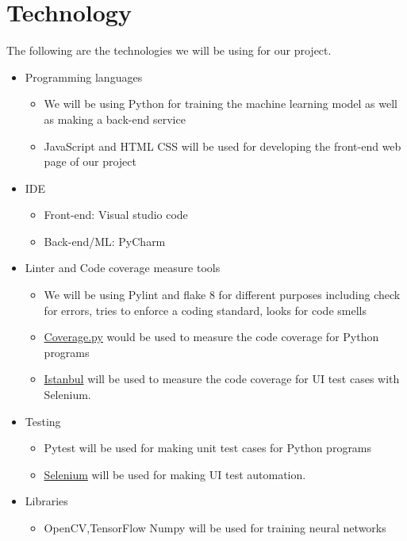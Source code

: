 \documentclass[12pt,letterpaper]{article}
\begin{document}
\section{Technology}
The following are the technologies we will be using for our project.
\begin{itemize}
    \item Programming languages
    \begin{itemize}
        \item We will be using Python for training the machine learning model as
        well as making a back-end service 
        \item JavaScript and HTML CSS will be used for developing the front-end
        web page of our project
    \end{itemize}
    \item IDE
    \begin{itemize}
        \item Front-end: Visual studio code
        \item Back-end/ML: PyCharm
    \end{itemize}
    \item Linter and Code coverage measure tools
    \begin{itemize}
        \item We will be using Pylint and flake 8 for different purposes
        including check for errors, tries to enforce a coding standard, looks
        for code smells
        \item \href{https://coverage.readthedocs.io/en/6.5.0/}{Coverage.py}
        would be used to measure the code coverage for Python programs
        \item \href{https://istanbul.js.org/}{Istanbul} will be used to measure
        the code coverage for UI test cases with Selenium.
    \end{itemize}
    \item Testing
    \begin{itemize}
        \item Pytest will be used for making unit test cases for Python programs
        \item \href{https://www.selenium.dev/}{Selenium} will be used for making
        UI test automation.
    \end{itemize}
    \item Libraries
    \begin{itemize}
        \item OpenCV,TensorFlow Numpy will be used for training neural networks

\end{itemize}
\end{itemize}
\end{document}
